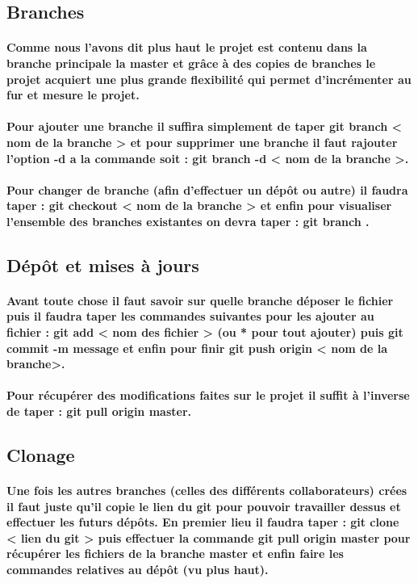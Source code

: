 \documentclass[a4paper, 12pt, twoside]{article}
\begin{document}
\subsection{Branches}
\paragraph{Comme nous l'avons dit plus haut le projet est contenu dans la branche principale la master et grâce à des copies de branches le projet 
acquiert une plus grande flexibilité qui permet d'incrémenter au fur et mesure le projet.}
\paragraph{Pour ajouter une branche il suffira simplement de taper  git branch < nom de la branche >  et pour supprimer une branche il faut rajouter
l'option -d a la commande soit :  git branch -d < nom de la branche >.}
\paragraph{  Pour changer de branche (afin d'effectuer un dépôt ou autre) il faudra taper :  git checkout < nom de la branche >   et enfin pour visualiser
l'ensemble des branches existantes on devra taper :  git branch .}
\subsection{Dépôt et mises à jours}
\paragraph{ Avant toute chose il faut savoir sur quelle branche déposer le fichier puis il faudra taper les commandes suivantes pour les ajouter 
au fichier :  git add < nom des fichier >  (ou * pour tout ajouter) puis  git commit -m message  et enfin pour finir git push origin < nom de la branche>.}
\paragraph{Pour récupérer des modifications faites sur le projet il suffit à l'inverse de taper : 
 git pull origin master.}
\subsection{Clonage}
\paragraph{Une fois les autres branches (celles des différents collaborateurs) crées il faut juste qu'il copie le lien du git pour pouvoir 
travailler dessus et effectuer les futurs dépôts. En premier lieu il faudra taper :  git clone < lien du git >  puis effectuer la commande
 git pull origin master  pour récupérer les fichiers de la branche master et enfin faire les commandes relatives au dépôt (vu plus haut).}
\end{document}
